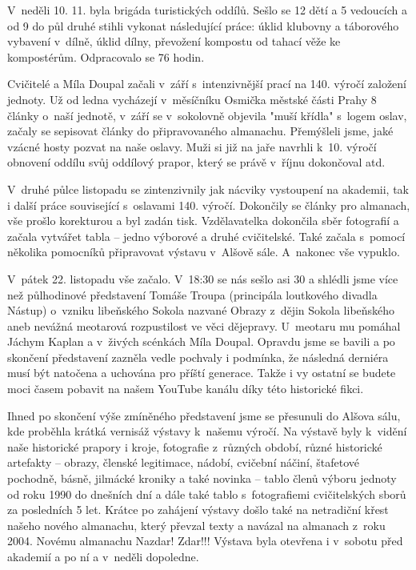 \documentclass[11pt]{article}
\begin{document}
V~neděli 10. 11. byla brigáda turistických oddílů. Sešlo se 12 dětí a 5 vedoucích a od 9 do půl druhé stihli vykonat následující práce: úklid klubovny a táborového vybavení v~dílně, úklid dílny, převožení kompostu od tahací věže ke kompostérům. Odpracovalo se 76 hodin.

\clearpage
{}
Cvičitelé a Míla Doupal začali v~září s~intenzivnější prací na 140. výročí založení jednoty. Už od ledna vycházejí v~měsíčníku Osmička městské části Prahy 8 články o~naší jednotě, v~září se v~sokolovně objevila "muší křídla" s~logem oslav, začaly se sepisovat články do připravovaného almanachu. Přemýšleli jsme, jaké vzácné hosty pozvat na naše oslavy. Muži si již na jaře navrhli k~10. výročí obnovení oddílu svůj oddílový prapor, který se právě v~říjnu dokončoval atd. 

V~druhé půlce listopadu se zintenzivnily jak nácviky vystoupení na akademii, tak i další práce související s~oslavami 140. výročí. Dokončily se články pro almanach, vše prošlo korekturou a byl zadán tisk. Vzdělavatelka dokončila sběr fotografií a začala vytvářet tabla – jedno výborové a druhé cvičitelské. Také začala s~pomocí několika pomocníků připravovat výstavu v~Alšově sále. A~nakonec vše vypuklo.

V~pátek 22. listopadu vše začalo. V~18:30 se nás sešlo asi 30 a shlédli jsme více než půlhodinové představení Tomáše Troupa (principála loutkového divadla Nástup) o~vzniku libeňského Sokola nazvané Obrazy z~dějin Sokola libeňského aneb nevážná meotarová rozpustilost ve věci dějepravy. U~meotaru mu pomáhal Jáchym Kaplan a v~živých scénkách Míla Doupal. Opravdu jsme se bavili a po skončení představení zazněla vedle pochvaly i podmínka, že následná derniéra musí být natočena a uchována pro příští generace. Takže i vy ostatní se budete moci časem pobavit na našem YouTube kanálu díky této historické fikci.

Ihned po skončení výše zmíněného představení jsme se přesunuli do Alšova sálu, kde proběhla krátká vernisáž výstavy k~našemu výročí. Na výstavě byly k~vidění naše historické prapory i kroje, fotografie z~různých období, různé historické artefakty – obrazy, členské legitimace, nádobí, cvičební náčiní, štafetové pochodně, básně, jilmácké kroniky a také novinka – tablo členů výboru jednoty od roku 1990 do dnešních dní a dále také tablo s~fotografiemi cvičitelských sborů za posledních 5 let. Krátce po zahájení výstavy došlo také na netradiční křest našeho nového almanachu, který převzal texty a navázal na almanach z~roku 2004. Novému almanachu Nazdar! Zdar!!! Výstava byla otevřena i v~sobotu před akademií a po ní a v~neděli dopoledne.
\end{document}
